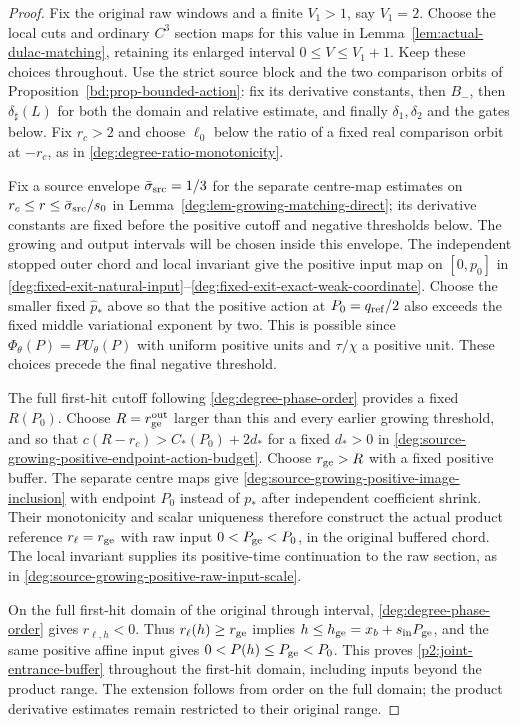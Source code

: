 \begin{proof}
Fix the original raw windows and a finite $V_1>1$, say $V_1=2$.
Choose the local cuts and ordinary $C^3$ section maps for this value in
Lemma~\ref{lem:actual-dulac-matching}, retaining its enlarged
interval $0\le V\le V_1+1$. Keep these choices throughout.
Use the strict source block and the two comparison orbits of
Proposition~\ref{bd:prop-bounded-action}: fix its derivative constants,
then $B_-$, then $\delta_\sharp(L)$ for both the domain and relative
estimate, and finally $\delta_1,\delta_2$ and the gates below.
Fix $r_c>2$ and choose $\ell_0$ below the ratio of a fixed real
comparison orbit at $-r_c$, as in
\eqref{deg:degree-ratio-monotonicity}.

Fix a source envelope $\bar\sigma_{\rm src}=1/3$ for the separate
centre-map estimates on $r_c\le r\le\bar\sigma_{\rm src}/s_0$ in
Lemma~\ref{deg:lem-growing-matching-direct}; its derivative constants
are fixed before the positive cutoff and negative thresholds below.
The growing and output intervals will be chosen inside this envelope.
The independent stopped outer chord and local invariant give the
positive input map on $[0,p_0]$ in
\eqref{deg:fixed-exit-natural-input}--\eqref{deg:fixed-exit-exact-weak-coordinate}.
Choose the smaller fixed $\widehat p_*$ above so that the positive
action at $P_0=q_{\rm ref}/2$ also exceeds the fixed middle
variational exponent by two. This is possible since
$\Phi_\theta(P)=PU_\theta(P)$ with uniform positive units and
$\tau/\chi$ a positive unit. These choices precede the final negative
threshold.

The full first-hit cutoff following \eqref{deg:degree-phase-order}
provides a fixed $R(P_0)$. Choose $R=r_{\rm ge}^{\rm out}$ larger
than this and every earlier growing threshold, and so that
$c(R-r_c)>C_*(P_0)+2d_*$ for a fixed $d_*>0$ in
\eqref{deg:source-growing-positive-endpoint-action-budget}.
Choose $r_{\rm ge}>R$ with a fixed positive buffer.
The separate centre maps give
\eqref{deg:source-growing-positive-image-inclusion} with endpoint
$P_0$ instead of $p_*$ after independent coefficient shrink.
Their monotonicity and scalar uniqueness therefore construct the
actual product reference $r_\ell=r_{\rm ge}$ with raw input
$0<P_{\rm ge}<P_0$, in the original buffered chord. The local
invariant supplies its positive-time continuation to the raw section,
as in \eqref{deg:source-growing-positive-raw-input-scale}.

On the full first-hit domain of the original through interval,
\eqref{deg:degree-phase-order} gives $r_{\ell,h}<0$.
Thus $r_\ell(h)\ge r_{\rm ge}$ implies
$h\le h_{\rm ge}=x_b+s_{\rm in}P_{\rm ge}$, and the same positive
affine input gives $0<P(h)\le P_{\rm ge}<P_0$.
This proves \eqref{p2:joint-entrance-buffer} throughout the first-hit
domain, including inputs beyond the product range. The extension follows
from order on the full domain; the product derivative estimates remain
restricted to their original range.


\end{proof}
